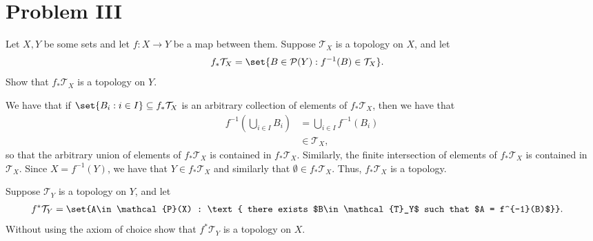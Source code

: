 \documentclass[10pt]{mypackage}
\begin{document}
\section{Problem III}%
\begin{problem}
  Let $X,Y$ be some sets and let $f\colon X\to Y$ be a map between them. Suppose $ \mathcal{T}_X $ is a topology on $X$, and let 
  \begin{align*}
    f_{\ast}\mathcal{T}_X &= \set{B\in \mathcal{P}(Y) : f^{-1}(B)\in \mathcal{T}_X}.
  \end{align*}
  Show that $f_{\ast}\mathcal{T}_X$ is a topology on $Y$.
\end{problem}
\begin{solution}
  We have that if $\set{B_i : i\in I}\subseteq f_{\ast}\mathcal{T}_X$ is an arbitrary collection of elements of $f_{\ast}\mathcal{T}_X$, then we have that
  \begin{align*}
    f^{-1}\left( \bigcup_{i\in I}B_i \right) &= \bigcup_{i\in I}f^{-1}\left( B_i \right)\\
                                             &\in \mathcal{T}_X,
  \end{align*}
  so that the arbitrary union of elements of $f_{\ast}\mathcal{T}_X$ is contained in $f_{\ast}\mathcal{T}_X$. Similarly, the finite intersection of elements of $f_{\ast}\mathcal{T}_X$ is contained in $\mathcal{T}_X$. Since $X = f^{-1}\left( Y \right)$, we have that $Y\in f_{\ast}\mathcal{T}_X$ and similarly that $\emptyset\in f_{\ast}\mathcal{T}_X$. Thus, $f_{\ast}\mathcal{T}_X$ is a topology.
\end{solution}
\begin{problem}
  Suppose $\mathcal{T}_Y$ is a topology on $Y$, and let 
  \begin{align*}
    f^{\ast}\mathcal{T}_Y &= \set{A\in \mathcal{P}(X) : \text{ there exists $B\in \mathcal{T}_Y$ such that $A = f^{-1}(B)$}}.
  \end{align*}
  Without using the axiom of choice show that $f^{\ast}\mathcal{T}_Y$ is a topology on $X$.
\end{problem}
\end{document}

